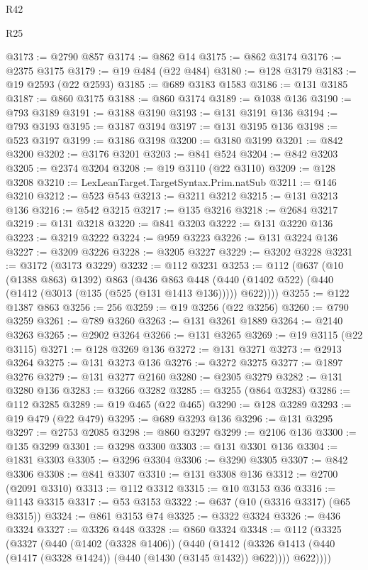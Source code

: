 \begin{lexlean}{R42}
\begin{lexlean}{R25}
\begin{coremodule}
{{{{{{{{{{{{{{{{{{{{{{{{{{{{{{{{{{{{{{{{{{{{{{{{{{{{{{{{{{{{{{{{{{{{{{{{{{{{{{{{{{{{{{{{{{{{{{{{{{{{{{{{{{{{{{{{{{{{{{{{{{{{{{{{{{{{{{{{{{{{{{{{{{{{{{{{{{{{{{{{{{{{{{{{{{{{{{{{{{{{{{{{{{{{{{{{{{{{{{{@3173 := @2790 @857
@3174 := @862 @14
@3175 := @862 @3174
@3176 := @2375 @3175
@3179 := @19 @484 (@22 @484)
@3180 := @128 @3179
@3183 := @19 @2593 (@22 @2593)
@3185 := @689 @3183 @1583
@3186 := @131 @3185
@3187 := @860 @3175
@3188 := @860 @3174
@3189 := @1038 @136
@3190 := @793 @3189
@3191 := @3188 @3190
@3193 := @131 @3191 @136
@3194 := @793 @3193
@3195 := @3187 @3194
@3197 := @131 @3195 @136
@3198 := @523 @3197
@3199 := @3186 @3198
@3200 := @3180 @3199
@3201 := @842 @3200
@3202 := @3176 @3201
@3203 := @841 @524
@3204 := @842 @3203
@3205 := @2374 @3204
@3208 := @19 @3110 (@22 @3110)
@3209 := @128 @3208
@3210 := LexLeanTarget.TargetSyntax.Prim.natSub
@3211 := @146 @3210
@3212 := @523 @543
@3213 := @3211 @3212
@3215 := @131 @3213 @136
@3216 := @542 @3215
@3217 := @135 @3216
@3218 := @2684 @3217
@3219 := @131 @3218
@3220 := @841 @3203
@3222 := @131 @3220 @136
@3223 := @3219 @3222
@3224 := @959 @3223
@3226 := @131 @3224 @136
@3227 := @3209 @3226
@3228 := @3205 @3227
@3229 := @3202 @3228
@3231 := @3172 (@3173 @3229)
@3232 := @112 @3231
@3253 := @112
    (@637
      (@10 (@1388 @863) @1392)
      @863
      (@436
        @863
        @448
        (@440 (@1402 @522) (@440 (@1412 (@3013 (@135 (@525 (@131 @1413 @136))))) @622))))
@3255 := @122 @1387 @863
@3256 := 256
@3259 := @19 @3256 (@22 @3256)
@3260 := @790 @3259
@3261 := @789 @3260
@3263 := @131 @3261 @1889
@3264 := @2140 @3263
@3265 := @2902 @3264
@3266 := @131 @3265
@3269 := @19 @3115 (@22 @3115)
@3271 := @128 @3269 @136
@3272 := @131 @3271
@3273 := @2913 @3264
@3275 := @131 @3273 @136
@3276 := @3272 @3275
@3277 := @1897 @3276
@3279 := @131 @3277 @2160
@3280 := @2305 @3279
@3282 := @131 @3280 @136
@3283 := @3266 @3282
@3285 := @3255 (@864 @3283)
@3286 := @112 @3285
@3289 := @19 @465 (@22 @465)
@3290 := @128 @3289
@3293 := @19 @479 (@22 @479)
@3295 := @689 @3293 @136
@3296 := @131 @3295
@3297 := @2753 @2085
@3298 := @860 @3297
@3299 := @2106 @136
@3300 := @135 @3299
@3301 := @3298 @3300
@3303 := @131 @3301 @136
@3304 := @1831 @3303
@3305 := @3296 @3304
@3306 := @3290 @3305
@3307 := @842 @3306
@3308 := @841 @3307
@3310 := @131 @3308 @136
@3312 := @2700 (@2091 @3310)
@3313 := @112 @3312
@3315 := @10 @3153 @36
@3316 := @1143 @3315
@3317 := @53 @3153
@3322 := @637 (@10 (@3316 @3317) (@65 @3315))
@3324 := @861 @3153 @74
@3325 := @3322 @3324
@3326 := @436 @3324
@3327 := @3326 @448
@3328 := @860 @3324
@3348 := @112
    (@3325
      (@3327
        (@440
          (@1402 (@3328 @1406))
          (@440
            (@1412 (@3326 @1413 (@440 (@1417 (@3328 @1424)) (@440 (@1430 (@3145 @1432)) @622))))
            @622))))
}}}}}}}}}}}}}}}}}}}}}}}}}}}}}}}}}}}}}}}}}}}}}}}}}}}}}}}}}}}}}}}}}}}}}}}}}}}}}}}}}}}}}}}}}}}}}}}}}}}}}}}}}}}}}}}}}}}}}}}}}}}}}}}}}}}}}}}}}}}}}}}}}}}}}}}}}}}}}}}}}}}}}}}}}}}}}}}}}}}}}}}}}}}}}}}}}}}}}}}
\end{coremodule}
\end{lexlean}
\end{lexlean}

